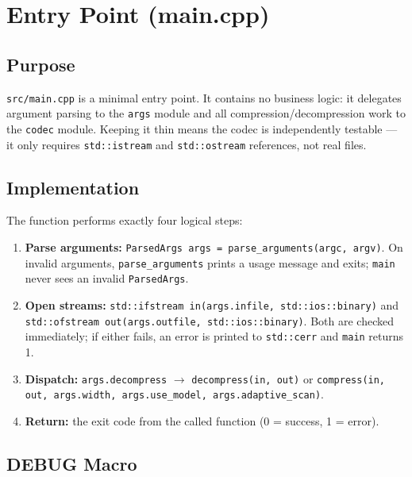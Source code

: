 \section{Entry Point (main.cpp)}

\subsection{Purpose}

\texttt{src/main.cpp} is a minimal entry point.
It contains no business logic: it delegates argument parsing to the \texttt{args} module
and all compression/decompression work to the \texttt{codec} module.
Keeping it thin means the codec is independently testable --- it only requires
\texttt{std::istream} and \texttt{std::ostream} references, not real files.

\subsection{Implementation}

The function performs exactly four logical steps:

\begin{enumerate}
  \item \textbf{Parse arguments:}
        \texttt{ParsedArgs args = parse\_arguments(argc, argv)}.
        On invalid arguments, \texttt{parse\_arguments} prints a usage message and exits;
        \texttt{main} never sees an invalid \texttt{ParsedArgs}.

  \item \textbf{Open streams:}
        \texttt{std::ifstream in(args.infile, std::ios::binary)} and
        \texttt{std::ofstream out(args.outfile, std::ios::binary)}.
        Both are checked immediately; if either fails, an error is printed to
        \texttt{std::cerr} and \texttt{main} returns 1.

  \item \textbf{Dispatch:}
        \texttt{args.decompress}
        $\to$ \texttt{decompress(in, out)}
        or \texttt{compress(in, out, args.width, args.use\_model, args.adaptive\_scan)}.

  \item \textbf{Return:} the exit code from the called function (0 = success, 1 = error).
\end{enumerate}

\subsection{DEBUG Macro}

